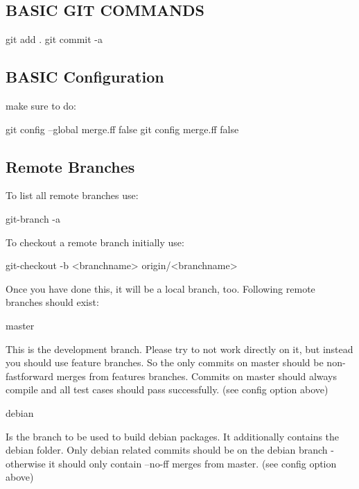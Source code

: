 \subsection*{B\+A\+S\+I\+C G\+I\+T C\+O\+M\+M\+A\+N\+D\+S}

\begin{DoxyVerb}    git add .
    git commit -a
\end{DoxyVerb}


\subsection*{B\+A\+S\+I\+C Configuration}

make sure to do\+: \begin{DoxyVerb}    git config --global merge.ff false
    git config merge.ff false
\end{DoxyVerb}


\subsection*{Remote Branches}

To list all remote branches use\+: \begin{DoxyVerb}    git-branch -a
\end{DoxyVerb}


To checkout a remote branch initially use\+: \begin{DoxyVerb}    git-checkout -b <branchname> origin/<branchname>
\end{DoxyVerb}


Once you have done this, it will be a local branch, too. Following remote branches should exist\+: \begin{DoxyVerb}    master
\end{DoxyVerb}


This is the development branch. Please try to not work directly on it, but instead you should use feature branches. So the only commits on master should be non-\/fastforward merges from features branches. Commits on master should always compile and all test cases should pass successfully. (see config option above)

\begin{DoxyVerb}    debian
\end{DoxyVerb}


Is the branch to be used to build debian packages. It additionally contains the debian folder. Only debian related commits should be on the debian branch -\/ otherwise it should only contain --no-\/ff merges from master. (see config option above)

